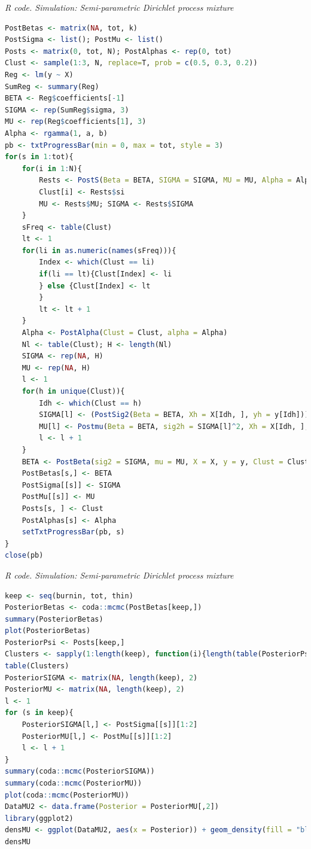 \begin{enumerate}[leftmargin=*]
\begin{tcolorbox}[enhanced,width=4.67in,center upper,
	fontupper=\large\bfseries,drop shadow southwest,sharp corners]
	\textit{R code. Simulation: Semi-parametric Dirichlet process mixture}
	\begin{VF}
		\begin{lstlisting}[language=R]
PostBetas <- matrix(NA, tot, k)
PostSigma <- list(); PostMu <- list()
Posts <- matrix(0, tot, N); PostAlphas <- rep(0, tot)
Clust <- sample(1:3, N, replace=T, prob = c(0.5, 0.3, 0.2))
Reg <- lm(y ~ X)
SumReg <- summary(Reg)
BETA <- Reg$coefficients[-1]
SIGMA <- rep(SumReg$sigma, 3)
MU <- rep(Reg$coefficients[1], 3)
Alpha <- rgamma(1, a, b)
pb <- txtProgressBar(min = 0, max = tot, style = 3)
for(s in 1:tot){
	for(i in 1:N){
		Rests <- PostS(Beta = BETA, SIGMA = SIGMA, MU = MU, Alpha = Alpha, Clust = Clust, i = i)
		Clust[i] <- Rests$si
		MU <- Rests$MU; SIGMA <- Rests$SIGMA
	}
	sFreq <- table(Clust)
	lt <- 1
	for(li in as.numeric(names(sFreq))){
		Index <- which(Clust == li)
		if(li == lt){Clust[Index] <- li
		} else {Clust[Index] <- lt
		}
		lt <- lt + 1
	}
	Alpha <- PostAlpha(Clust = Clust, alpha = Alpha)
	Nl <- table(Clust); H <- length(Nl)
	SIGMA <- rep(NA, H)
	MU <- rep(NA, H)
	l <- 1
	for(h in unique(Clust)){
		Idh <- which(Clust == h)
		SIGMA[l] <- (PostSig2(Beta = BETA, Xh = X[Idh, ], yh = y[Idh]))^0.5
		MU[l] <- Postmu(Beta = BETA, sig2h = SIGMA[l]^2, Xh = X[Idh, ], yh = y[Idh])
		l <- l + 1
	}
	BETA <- PostBeta(sig2 = SIGMA, mu = MU, X = X, y = y, Clust = Clust) 
	PostBetas[s,] <- BETA
	PostSigma[[s]] <- SIGMA
	PostMu[[s]] <- MU
	Posts[s, ] <- Clust
	PostAlphas[s] <- Alpha
	setTxtProgressBar(pb, s)
}
close(pb)
\end{lstlisting}
	\end{VF}
\end{tcolorbox}

\begin{tcolorbox}[enhanced,width=4.67in,center upper,
	fontupper=\large\bfseries,drop shadow southwest,sharp corners]
	\textit{R code. Simulation: Semi-parametric Dirichlet process mixture}
	\begin{VF}
		\begin{lstlisting}[language=R]
keep <- seq(burnin, tot, thin)
PosteriorBetas <- coda::mcmc(PostBetas[keep,])
summary(PosteriorBetas)
plot(PosteriorBetas)
PosteriorPsi <- Posts[keep,]
Clusters <- sapply(1:length(keep), function(i){length(table(PosteriorPsi[i,]))})
table(Clusters)
PosteriorSIGMA <- matrix(NA, length(keep), 2)
PosteriorMU <- matrix(NA, length(keep), 2)
l <- 1
for (s in keep){
	PosteriorSIGMA[l,] <- PostSigma[[s]][1:2]
	PosteriorMU[l,] <- PostMu[[s]][1:2]
	l <- l + 1
}
summary(coda::mcmc(PosteriorSIGMA))
summary(coda::mcmc(PosteriorMU))
plot(coda::mcmc(PosteriorMU))
DataMU2 <- data.frame(Posterior = PosteriorMU[,2]) 
library(ggplot2)
densMU <- ggplot(DataMU2, aes(x = Posterior)) + geom_density(fill = "blue", alpha = 0.3) + labs(x = "Intercept", y = "Density") + theme_minimal()
densMU 
\end{lstlisting}
	\end{VF}
\end{tcolorbox}


\end{enumerate}
